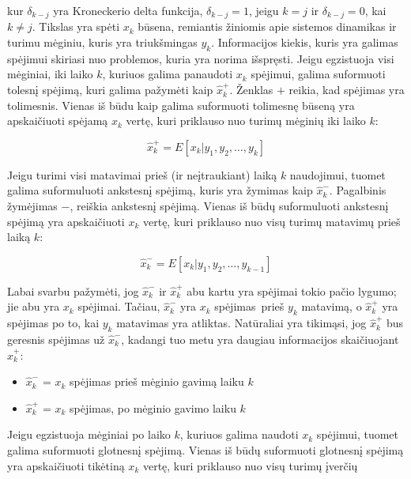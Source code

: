     kur $\delta_{k-j}$ yra Kroneckerio delta funkcija, $\delta_{k-j} = 1$, jeigu $k=j$ ir $\delta_{k-j} = 0$, kai $k \neq j$.
    Tikslas yra spėti $x_k$ būsena, remiantis žiniomis apie sistemos dinamikas ir turimu mėginiu, kuris yra triukšmingas ${y_k}$.
    Informacijos kiekis, kuris yra galimas spėjimui skiriasi nuo problemos, kuria yra norima išspręsti.
    Jeigu egzistuoja visi mėginiai, iki laiko $k$, kuriuos galima panaudoti $x_k$ spėjimui, galima suformuoti tolesnį spėjimą, kuri galima pažymėti kaip $\hat{x}_k^{+}$.
    Ženklas $+$ reikia, kad spėjimas yra tolimesnis.
    Vienas iš būdu kaip galima suformuoti tolimesnę būseną yra apskaičiuoti spėjamą $x_k$ vertę, kuri priklauso nuo turimų mėginių iki laiko $k$:

    \begin{equation}
        \hat{x}_k^{+} = E[x_k|y_1,y_2, \dots , y_k]
    \end{equation}

    Jeigu turimi visi matavimai prieš (ir neįtraukiant) laiką $k$ naudojimui, tuomet galima suformuluoti ankstesnį spėjimą, kuris yra žymimas kaip $\hat{x}_k^{-}$.
    Pagalbinis žymėjimas $-$, reiškia ankstesnį spėjimą.
    Vienas iš būdų suformuluoti ankstesnį spėjimą yra apskaičiuoti $x_k$ vertę, kuri priklauso nuo visų turimų matavimų prieš laiką $k$:

    \begin{equation}
        \hat{x}_k^{-} = E[x_k|y_1,y_2,\dots, y_{k-1}]
    \end{equation}

    Labai svarbu pažymėti, jog $\hat{x}^-_k$ ir $\hat{x}_k^{+}$ abu kartu yra spėjimai tokio pačio lygumo; jie abu yra $x_k$ spėjimai.
    Tačiau, $\hat{x}_k^-$ yra $x_k$ spėjimas prieš $y_k$ matavimą, o $\hat{x}_k^+$ yra spėjimas po to, kai $y_k$ matavimas yra atliktas.
    Natūraliai yra tikimąsi, jog $\hat{x}_k^+$ bus geresnis spėjimas už $\hat{x}_k^-$, kadangi tuo metu yra daugiau informacijos skaičiuojant $\hat{x}_k^+$:

    \begin{itemize}
        \item $\hat{x}_k^-$ = $x_k$ spėjimas prieš mėginio gavimą laiku $k$
        \item $\hat{x}_k^+$ = $x_k$ spėjimas, po mėginio gavimo laiku $k$
    \end{itemize}

    Jeigu egzistuoja mėginiai po laiko $k$, kuriuos galima naudoti $x_k$ spėjimui, tuomet galima suformuoti glotnesnį spėjimą.
    Vienas iš būdų suformuoti glotnesnį spėjimą yra apskaičiuoti tikėtiną $x_k$ vertę, kuri priklauso nuo visų turimų įverčių

